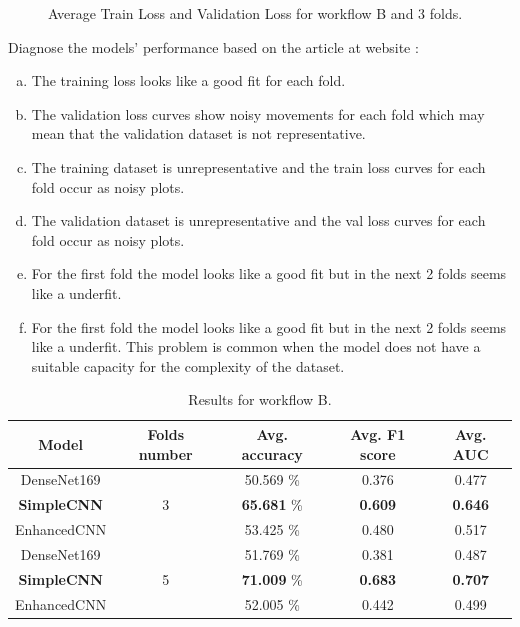 \documentclass[runningheads]{llncs}
\begin{document}
\begin{figure}[H]
{}
\quad
{}
\label{AvgPlotB}
\caption{Average Train Loss and Validation Loss for workflow B and 3 folds.}
\end{figure}

Diagnose the models' performance based on the article at website \cite{LearningCurves}:

\begin{enumerate}[(a)]
\item The training loss looks like a good fit for each fold.
\item The validation loss curves show noisy movements for each fold which may mean that the validation dataset is not representative.
\item The training dataset is unrepresentative and the train loss curves for each fold occur as noisy plots.
\item The validation dataset is unrepresentative and the val loss curves for each fold occur as noisy plots.
\item For the first fold the model looks like a good fit but in the next 2 folds seems like a underfit.
\item For the first fold the model looks like a good fit but in the next 2 folds seems like a underfit. This problem is common when the model does not have a suitable capacity for the complexity of the dataset.
\end{enumerate}

\begin{table}[H]
\centering
\caption{Results for workflow B.}
\begin{tabular}{|c|c|c|c|c|}
\hline
Model       & Folds number & Avg. accuracy & Avg. F1 score & Avg. AUC   \\ \hline
DenseNet169 &              & 50.569 \%        & 0.376    & 0.477 \\ \cline{1-1} \cline{3-5} 
\textbf{SimpleCNN}   & 3            & \textbf{65.681} \%        & \textbf{0.609}    & \textbf{0.646} \\ \cline{1-1} \cline{3-5} 
EnhancedCNN &              & 53.425 \%        & 0.480    & 0.517 \\ \hline
DenseNet169 &              & 51.769 \%        & 0.381    & 0.487 \\ \cline{1-1} \cline{3-5} 
\textbf{SimpleCNN}   & 5            & \textbf{71.009} \%        & \textbf{0.683}    & \textbf{0.707} \\ \cline{1-1} \cline{3-5} 
EnhancedCNN &              & 52.005 \%        & 0.442    & 0.499 \\ \hline
\end{tabular}
\label{ResultsA}
\end{table}
\end{document}
